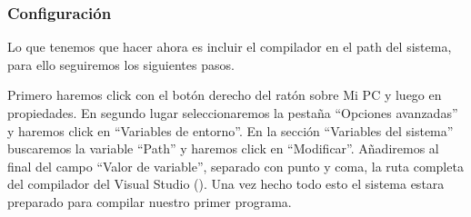 \subsubsection{Configuración}
Lo que tenemos que hacer ahora es incluir el compilador  en el path del sistema, para ello
seguiremos los siguientes pasos.

Primero haremos click con el botón derecho del ratón sobre Mi PC y luego en propiedades.
En segundo lugar seleccionaremos la pestaña ``Opciones avanzadas'' y haremos click en ``Variables de entorno''.
En la sección ``Variables del sistema'' buscaremos la variable ``Path'' y haremos click en ``Modificar''.
Añadiremos al final del campo ``Valor de variable'', separado con punto y coma, la ruta completa del compilador
del Visual Studio ().
Una vez hecho todo esto el sistema estara preparado para compilar nuestro primer programa.